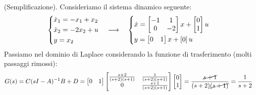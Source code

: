 \begin{esem}
(Semplificazione). Consideriamo il sistema dinamico seguente:
\begin{equation*}
\begin{dcases}
\dot x_1 = -x_1 + x_2  \\
\dot x_2 = -2x_2 + u \\
y=x_2
\end{dcases} \quad \longrightarrow \quad 
\begin{dcases}
\dot x = \begin{bmatrix}
-1 & 1 \\ 0 & -2
\end{bmatrix} x + \begin{bmatrix}
0 \\ 1
\end{bmatrix} u \\
y = \begin{bmatrix}
0 & 1
\end{bmatrix} x + \left[ 0 \right] u
\end{dcases}
\end{equation*}
Passiamo nel dominio di Laplace considerando la funzione di trasferimento (molti passaggi rimossi):
\begin{equation*}
G(s) = C(sI-A)^{-1}B+D = \begin{bmatrix}
0 & 1
\end{bmatrix}\begin{bmatrix}
\frac{s+2}{(s+2)(s+1)} & \frac{1}{(s+2)(s+1)} \\ 0 & \frac{s+1}{(s+2)(s+1)}
\end{bmatrix}\begin{bmatrix}
0 \\ 1
\end{bmatrix} = \frac{\cancel{s+1}}{(s+2)\cancel{(s+1)}} = \frac{1}{s+2} 
\end{equation*}
\end{esem}

\newpage
